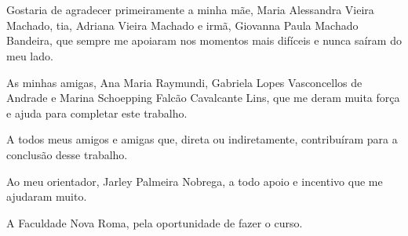 \section*{} 
Gostaria de agradecer primeiramente a minha mãe, Maria Alessandra Vieira Machado, tia, Adriana Vieira Machado e irmã, Giovanna Paula Machado Bandeira, que sempre me apoiaram nos momentos mais difíceis e nunca saíram do meu lado.

As minhas amigas, Ana Maria Raymundi, Gabriela Lopes Vasconcellos de Andrade e Marina Schoepping Falcão Cavalcante Lins, que me deram muita força e ajuda para completar este trabalho.

A todos meus amigos e amigas que, direta ou indiretamente, contribuíram para a conclusão desse trabalho.

Ao meu orientador, Jarley Palmeira Nobrega, a todo apoio e incentivo que me ajudaram muito.

A Faculdade Nova Roma, pela oportunidade de fazer o curso.

